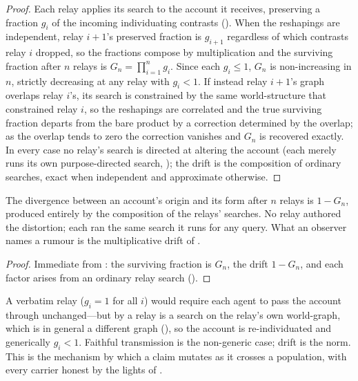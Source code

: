 \documentclass[11pt,twocolumn,a4paper]{article}
\begin{document}
\begin{proof}
Each relay applies its search to the account it receives, preserving a
fraction $g_i$ of the incoming individuating contrasts ().
When the reshapings are independent, relay $i{+}1$'s preserved fraction is
$g_{i+1}$ regardless of which contrasts relay $i$ dropped, so the fractions
compose by multiplication and the surviving fraction after $n$ relays is
$G_n=\prod_{i=1}^n g_i$. Since each $g_i\le1$, $G_n$ is non-increasing in
$n$, strictly decreasing at any relay with $g_i<1$. If instead relay
$i{+}1$'s graph overlaps relay $i$'s, its search is constrained by the same
world-structure that constrained relay $i$, so the reshapings are
correlated and the true surviving fraction departs from the bare product by
a correction determined by the overlap; as the overlap tends to zero the
correction vanishes and $G_n$ is recovered exactly. In every case no relay's
search is directed at altering the account (each merely runs its own
purpose-directed search, ); the drift is the composition
of ordinary searches, exact when independent and approximate otherwise.
\end{proof}

\begin{corollary}
\label{cor:rumour}
The divergence between an account's origin and its form after $n$ relays is
$1-G_n$, produced entirely by the composition of the relays' searches. No
relay authored the distortion; each ran the same search it runs for any
query. What an observer names a rumour is the multiplicative drift of
.
\end{corollary}

\begin{proof}
Immediate from : the surviving fraction is $G_n$, the drift
$1-G_n$, and each factor arises from an ordinary relay search
().
\end{proof}

\begin{remark}
\label{rem:mustmove}
A verbatim relay ($g_i=1$ for all $i$) would require each agent to pass the
account through unchanged---but by  a relay is a search
on the relay's own world-graph, which is in general a different graph
(), so the account is re-individuated and generically
$g_i<1$. Faithful transmission is the non-generic case; drift is the norm.
This is the mechanism by which a claim mutates as it crosses a population,
with every carrier honest by the lights of .
\end{remark}
\end{document}
